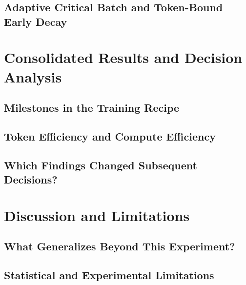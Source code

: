 \subsection{Adaptive Critical Batch and Token-Bound Early Decay}

\section{Consolidated Results and Decision Analysis}
\label{sec:results}
\subsection{Milestones in the Training Recipe}
\subsection{Token Efficiency and Compute Efficiency}
\subsection{Which Findings Changed Subsequent Decisions?}

\section{Discussion and Limitations}
\label{sec:discussion}
\subsection{What Generalizes Beyond This Experiment?}
\subsection{Statistical and Experimental Limitations}
